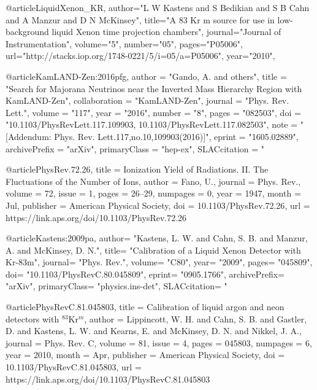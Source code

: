 {{{%
@article{LiquidXenon_KR,
  author="{L W Kastens and S Bedikian and S B Cahn and A Manzur and D N McKinsey}",
  title="{A 83 Kr m source for use in low-background liquid Xenon time projection chambers}",
  journal="{Journal of Instrumentation}",
  volume="{5}",
  number="{05}",
  pages="{P05006}",
  url="{http://stacks.iop.org/1748-0221/5/i=05/a=P05006}",
  year="{2010}",
}
	
@article{KamLAND-Zen:2016pfg,
      author         = "Gando, A. and others",
      title          = "{Search for Majorana Neutrinos near the Inverted Mass
                        Hierarchy Region with KamLAND-Zen}",
      collaboration  = "KamLAND-Zen",
      journal        = "Phys. Rev. Lett.",
      volume         = "117",
      year           = "2016",
      number         = "8",
      pages          = "082503",
      doi            = "10.1103/PhysRevLett.117.109903,
                        10.1103/PhysRevLett.117.082503",
      note           = "[Addendum: Phys. Rev. Lett.117,no.10,109903(2016)]",
      eprint         = "1605.02889",
      archivePrefix  = "arXiv",
      primaryClass   = "hep-ex",
      SLACcitation   = "%
}


@article{PhysRev.72.26,
  title = {Ionization Yield of Radiations. II. The Fluctuations of the Number of Ions},
  author = {Fano, U.},
  journal = {Phys. Rev.},
  volume = {72},
  issue = {1},
  pages = {26--29},
  numpages = {0},
  year = {1947},
  month = {Jul},
  publisher = {American Physical Society},
  doi = {10.1103/PhysRev.72.26},
  url = {https://link.aps.org/doi/10.1103/PhysRev.72.26}
}

@article{Kastens:2009pa,
      author= "Kastens, L. W. and Cahn, S. B. and Manzur, A. and McKinsey, D. N.",
      title= "Calibration of a Liquid Xenon Detector with Kr-83m",
      journal= "Phys. Rev.",
      volume= "C80",
      year= "2009",
      pages= "045809",
      doi= "10.1103/PhysRevC.80.045809",
      eprint= "0905.1766",
      archivePrefix= "arXiv",
      primaryClass= "physics.ins-det",
      SLACcitation= "%
}

@article{PhysRevC.81.045803,
  title = {Calibration of liquid argon and neon detectors with $^{83}\mathrm{Kr}$${}^{m}$},
  author = {Lippincott, W. H. and Cahn, S. B. and Gastler, D. and Kastens, L. W. and Kearns, E. and McKinsey, D. N. and Nikkel, J. A.},
  journal = {Phys. Rev. C},
  volume = {81},
  issue = {4},
  pages = {045803},
  numpages = {6},
  year = {2010},
  month = {Apr},
  publisher = {American Physical Society},
  doi = {10.1103/PhysRevC.81.045803},
  url = {https://link.aps.org/doi/10.1103/PhysRevC.81.045803}
}
 
}}}
